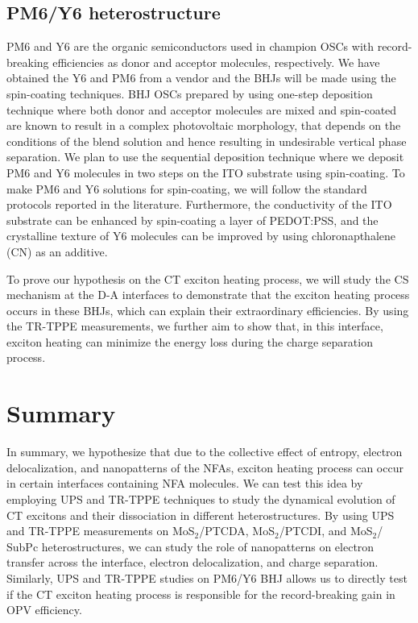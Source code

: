\documentclass[12pt]{article}
\begin{document}
\subsection{PM6/Y6 heterostructure}
PM6 and Y6 are the organic semiconductors used in champion OSCs with record-breaking efficiencies as donor and acceptor molecules, respectively. We have obtained the Y6 and PM6 from a vendor and the BHJs will be made using the spin-coating techniques. BHJ OSCs prepared  by using one-step deposition technique where both donor and acceptor molecules are mixed and spin-coated are known to result in a complex photovoltaic morphology, that depends on the conditions of the blend solution and hence resulting in undesirable vertical phase separation. We plan to use the sequential deposition technique where we deposit PM6 and Y6 molecules in two steps on the ITO substrate using spin-coating. To make PM6 and Y6 solutions for spin-coating, we will follow the standard protocols reported in the literature. Furthermore, the conductivity of the ITO substrate can be enhanced by spin-coating a layer of PEDOT:PSS, and the crystalline texture of Y6 molecules can be improved by using chloronapthalene (CN) as an additive.

To prove our hypothesis on the CT exciton heating process, we will study the CS mechanism at the D-A interfaces to demonstrate that the exciton heating process occurs in these BHJs, which can explain their extraordinary efficiencies. By using the TR-TPPE measurements, we further aim to show that, in this interface, exciton heating can minimize the energy loss during the charge separation process.



\section{Summary}
In summary, we hypothesize that due to the collective effect of entropy, electron delocalization, and nanopatterns of the NFAs, exciton heating process can occur in certain interfaces containing NFA molecules. We can test this idea by employing UPS and TR-TPPE techniques to study the dynamical evolution of CT excitons and their dissociation in different heterostructures. By using UPS and TR-TPPE measurements on MoS$_2$/PTCDA, MoS$_2$/PTCDI, and MoS$_2$/ SubPc heterostructures, we can study the role of nanopatterns on electron transfer across the interface, electron delocalization, and charge separation. Similarly, UPS and TR-TPPE studies on PM6/Y6 BHJ allows us to directly test if the CT exciton heating process is responsible for the record-breaking gain in OPV efficiency.



\end{document}
